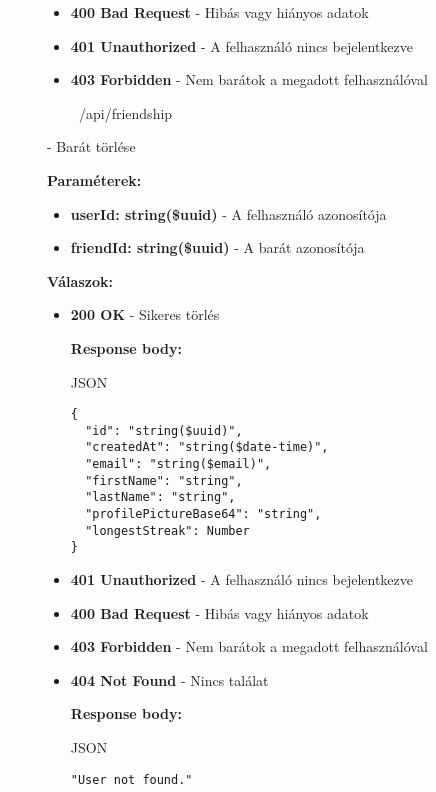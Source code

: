 \documentclass[12pt]{report}
\newcommand{\httpDelete}[1]{\colorbox{deleteColor}{\textbf{\textcolor{white}{DELETE}}}~#1}
\begin{document}
\begin{description}
\begin{itemize}
      \item \textbf{400 Bad Request} - Hibás vagy hiányos adatok

      \item \textbf{401 Unauthorized} - A felhasználó nincs bejelentkezve

      \item \textbf{403 Forbidden} - Nem barátok a megadott felhasználóval
      
    \end{itemize}

  \item[\httpDelete{/api/friendship}] - Barát törlése
  
    \vspace{0.5cm}
    \textbf{Paraméterek:}
    \begin{itemize}
      \item \textbf{userId: string(\$uuid)} - A felhasználó azonosítója
      \item \textbf{friendId: string(\$uuid)} - A barát azonosítója
    \end{itemize}

    \vspace{0.5cm}
    \textbf{Válaszok:}
    \begin{itemize}
      \item \textbf{200 OK} - Sikeres törlés

        \textbf{Response body:}
        \begin{codeblock}{JSON}
          \begin{verbatim}
{
  "id": "string($uuid)",
  "createdAt": "string($date-time)",
  "email": "string($email)",
  "firstName": "string",
  "lastName": "string",
  "profilePictureBase64": "string",
  "longestStreak": Number
}
          \end{verbatim}
        \end{codeblock}

      \item \textbf{401 Unauthorized} - A felhasználó nincs bejelentkezve

      \item \textbf{400 Bad Request} - Hibás vagy hiányos adatok
      
      \item \textbf{403 Forbidden} - Nem barátok a megadott felhasználóval

      \item \textbf{404 Not Found} - Nincs találat

        \textbf{Response body:}
        \begin{codeblock}{JSON}
          \begin{verbatim}
"User not found."
          \end{verbatim}
        \end{codeblock}
    \end{itemize}
\end{description}
\end{document}
